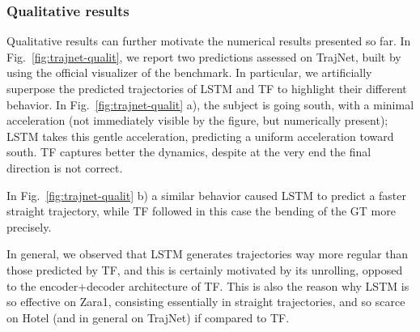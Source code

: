 \documentclass[a4paper,conference]{IEEEtran}
\begin{document}
\subsubsection{Qualitative results \label{Sec:qualitative}}
Qualitative results can further motivate the numerical results presented so far. In Fig.~\ref{fig:trajnet-qualit}, we report two predictions assessed on TrajNet, built by using the official visualizer of the benchmark. In particular, we artificially superpose the predicted trajectories of LSTM and TF to highlight their different behavior. In Fig.~\ref{fig:trajnet-qualit} a), the subject is going south, with a minimal acceleration (not immediately visible by the figure, but numerically present); LSTM takes this gentle acceleration, predicting a uniform acceleration toward south. TF captures better the dynamics, despite at the very end the final direction is not correct. 

In Fig.~\ref{fig:trajnet-qualit} b) a similar behavior caused LSTM to predict a faster straight trajectory, while TF followed in this case the bending of the GT more precisely.  

In general, we observed that LSTM generates trajectories way more regular than those predicted by TF, and this is certainly motivated by its unrolling, opposed to the encoder+decoder architecture of TF. This is also the reason why LSTM is so effective on Zara1, consisting essentially in straight trajectories, and so scarce on Hotel (and in general on TrajNet) if compared to TF. 
\end{document}
